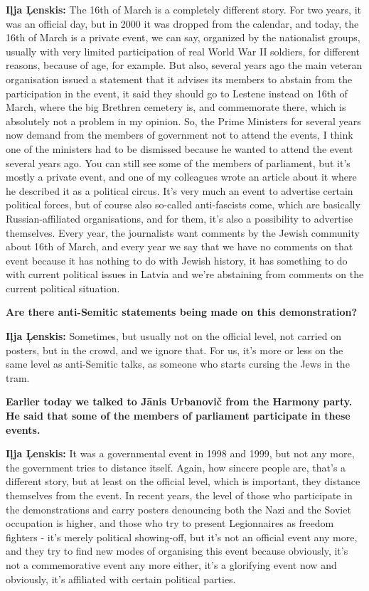 \textbf{Iļja Ļenskis:} The 16th of March is a completely different story. For two years, it was an official day, but in 2000 it was dropped from the calendar, and today, the 16th of March is a private event, we can say, organized by the nationalist groups, usually with very limited participation of real World War II soldiers, for different reasons, because of age, for example. But also, several years ago the main veteran organisation issued a statement that it advises its members to abstain from the participation in the event, it said they should go to Lestene instead  on 16th of March, where the big Brethren cemetery is, and commemorate there, which is absolutely not a problem in my opinion. So, the Prime Ministers for several years now demand from the members of government not to attend the events, I think one of the ministers had to be dismissed because he wanted to attend the event several years ago. You can still see some of the members of parliament, but it’s mostly a private event, and one of my colleagues wrote an article about it where he described it as a political circus. It’s very much an event to advertise certain political forces, but of course also so-called anti-fascists come, which are basically Russian-affiliated organisations, and for them, it’s also a possibility to advertise themselves. Every year, the journalists want comments by the Jewish community about 16th of March, and every year we say that we have no comments on that event because it has nothing to do with Jewish history, it has something to do with current political issues in Latvia and we’re abstaining from comments on the current political situation. 

\textbf{Are there anti-Semitic statements being made on this demonstration?} 

\textbf{Iļja Ļenskis:} Sometimes, but usually not on the official level, not carried on posters, but in the crowd, and we ignore that. 
For us, it’s more or less on the same level as anti-Semitic talks, as someone who starts cursing the Jews in the tram. 

\textbf{Earlier today we talked to Jānis Urbanovič from the Harmony party. He said that some of the members of parliament participate in these events.} 

\textbf{Iļja Ļenskis:} It was a governmental event in 1998 and 1999, but not any more, the government tries to distance itself. Again, how sincere people are, that’s a different story, but at least on the official level, which is important, they distance themselves from the event. In recent years, the level of those who participate in the demonstrations and carry posters denouncing both the Nazi and the Soviet occupation  is higher, and those who try to present Legionnaires as freedom fighters - it’s merely political showing-off, but it’s not an official event any more, and they try to find new modes of organising this event because obviously, it’s not a commemorative event any more either, it’s a glorifying event now and obviously, it’s affiliated with certain political parties. 

